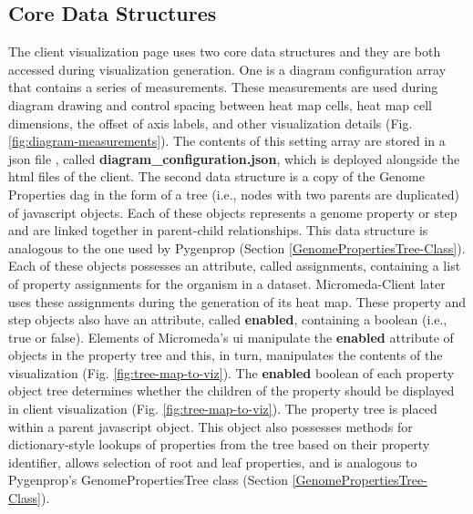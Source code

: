 \subsection{Core Data Structures} \label{visual-data-structures}

The client visualization page uses two core data structures and they are both accessed during visualization generation. One is a diagram configuration array that contains a series of measurements. These measurements are used during diagram drawing and control spacing between heat map cells, heat map cell dimensions, the offset of axis labels, and other visualization details (Fig. \ref{fig:diagram-measurements}). The contents of this setting array are stored in a \gls{json} file \cite{bray2014rfc}, called \textbf{diagram\_configuration.json}, which is deployed alongside the \gls{html} files of the client. The second data structure is a copy of the Genome Properties \gls{dag} in the form of a tree (i.e., nodes with two parents are duplicated) of \gls{javascript} objects. Each of these objects represents a genome property or step and are linked together in parent-child relationships. This data structure is analogous to the one used by Pygenprop (Section \ref{GenomePropertiesTree-Class}). Each of these objects possesses an attribute, called assignments, containing a list of property assignments for the organism in a dataset. Micromeda-Client later uses these assignments during the generation of its heat map. These property and step objects also have an attribute, called \textbf{enabled}, containing a boolean (i.e., true or false). Elements of Micromeda's \gls{ui} manipulate the \textbf{enabled} attribute of objects in the property tree and this, in turn, manipulates the contents of the visualization (Fig. \ref{fig:tree-map-to-viz}). The \textbf{enabled} boolean of each property object tree determines whether the children of the property should be displayed in client visualization (Fig. \ref{fig:tree-map-to-viz}). The property tree is placed within a parent \gls{javascript} object. This object also possesses methods for dictionary-style lookups of properties from the tree based on their property identifier, allows selection of root and leaf properties, and is analogous to Pygenprop's GenomePropertiesTree class (Section \ref{GenomePropertiesTree-Class}).

